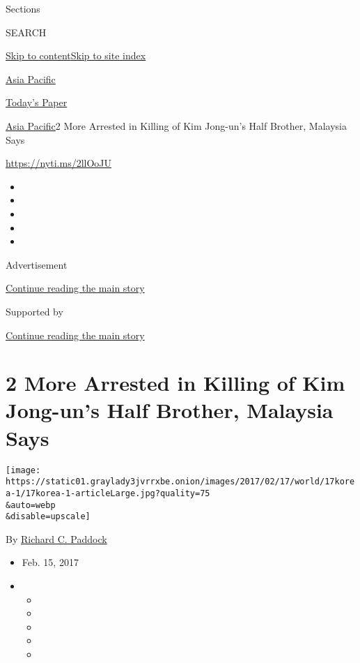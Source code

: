 Sections

SEARCH

\protect\hyperlink{site-content}{Skip to
content}\protect\hyperlink{site-index}{Skip to site index}

\href{https://www.nytimes3xbfgragh.onion/section/world/asia}{Asia
Pacific}

\href{https://myaccount.nytimes3xbfgragh.onion/auth/login?response_type=cookie\&client_id=vi}{}

\href{https://www.nytimes3xbfgragh.onion/section/todayspaper}{Today's
Paper}

\href{/section/world/asia}{Asia Pacific}\textbar{}2 More Arrested in
Killing of Kim Jong-un's Half Brother, Malaysia Says

\url{https://nyti.ms/2llOoJU}

\begin{itemize}
\item
\item
\item
\item
\item
\end{itemize}

Advertisement

\protect\hyperlink{after-top}{Continue reading the main story}

Supported by

\protect\hyperlink{after-sponsor}{Continue reading the main story}

\hypertarget{2-more-arrested-in-killing-of-kim-jong-uns-half-brother-malaysia-says}{%
\section{2 More Arrested in Killing of Kim Jong-un's Half Brother,
Malaysia
Says}\label{2-more-arrested-in-killing-of-kim-jong-uns-half-brother-malaysia-says}}

\texttt{[image: https://static01.graylady3jvrrxbe.onion/images/2017/02/17/world/17korea-1/17korea-1-articleLarge.jpg?quality=75\\\&auto=webp\\\&disable=upscale]}

By
\href{https://www.nytimes3xbfgragh.onion/by/richard-c-paddock}{Richard
C. Paddock}

\begin{itemize}
\item
  Feb. 15, 2017
\item
  \begin{itemize}
  \item
  \item
  \item
  \item
  \item
  \end{itemize}
\end{itemize}

